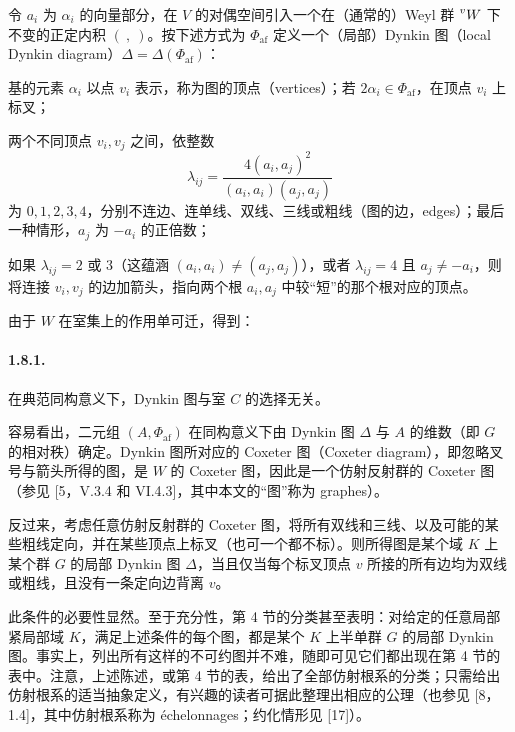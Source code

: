 令 $a_i$ 为 $\alpha_i$ 的向量部分，在 $V$ 的对偶空间引入一个在（通常的）Weyl 群 $\prescript{v}{}{W}$ 下不变的正定内积 $(\ ,\ )$。按下述方式为 $\Phi_{\mathrm{af}}$ 定义一个（局部）Dynkin 图（local Dynkin diagram）$\Delta=\Delta(\Phi_{\mathrm{af}})$：

基的元素 $\alpha_i$ 以点 $v_i$ 表示，称为图的顶点（vertices）；若 $2\alpha_i\in\Phi_{\mathrm{af}}$，在顶点 $v_i$ 上标叉；

两个不同顶点 $v_i,v_j$ 之间，依整数
\[
\lambda_{ij}=\frac{4(a_i,a_j)^2}{(a_i,a_i)(a_j,a_j)}
\]
为 $0,1,2,3,4$，分别不连边、连单线、双线、三线或粗线（图的边，edges）；最后一种情形，$a_j$ 为 $-a_i$ 的正倍数；

如果 $\lambda_{ij}=2$ 或 $3$（这蕴涵 $(a_i,a_i)\ne(a_j,a_j)$），或者 $\lambda_{ij}=4$ 且 $a_j\ne-a_i$，则将连接 $v_i,v_j$ 的边加箭头，指向两个根 $a_i,a_j$ 中较“短”的那个根对应的顶点。

由于 $W$ 在室集上的作用单可迁，得到：

\paragraph*{1.8.1.}在典范同构意义下，Dynkin 图与室 $C$ 的选择无关。

容易看出，二元组 $(A,\Phi_{\mathrm{af}})$ 在同构意义下由 Dynkin 图 $\Delta$ 与 $A$ 的维数（即 $G$ 的相对秩）确定。Dynkin 图所对应的 Coxeter 图（Coxeter diagram），即忽略叉号与箭头所得的图，是 $W$ 的 Coxeter 图，因此是一个仿射反射群的 Coxeter 图（参见 [5，V.3.4 和 VI.4.3]，其中本文的“图”称为 graphes）。

反过来，考虑任意仿射反射群的 Coxeter 图，将所有双线和三线、以及可能的某些粗线定向，并在某些顶点上标叉（也可一个都不标）。则所得图是某个域 $K$ 上某个群 $G$ 的局部 Dynkin 图 $\Delta$，当且仅当每个标叉顶点 $v$ 所接的所有边均为双线或粗线，且没有一条定向边背离 $v$。

此条件的必要性显然。至于充分性，第 4 节的分类甚至表明：对给定的任意局部紧局部域 $K$，满足上述条件的每个图，都是某个 $K$ 上半单群 $G$ 的局部 Dynkin 图。事实上，列出所有这样的不可约图并不难，随即可见它们都出现在第 4 节的表中。注意，上述陈述，或第 4 节的表，给出了全部仿射根系的分类；只需给出仿射根系的适当抽象定义，有兴趣的读者可据此整理出相应的公理（也参见 [8，1.4]，其中仿射根系称为 échelonnages；约化情形见 [17]）。

